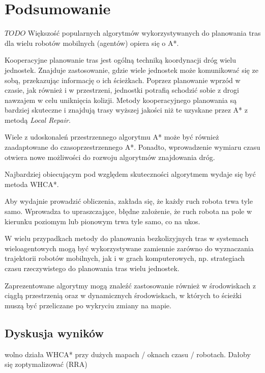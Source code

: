 \chapter{Podsumowanie}
\label{ch:podsumowanie}

$TODO$
Większość popularnych algorytmów wykorzystywanych do planowania tras dla wielu robotów mobilnych (agentów) opiera się o A*.

Kooperacyjne planowanie tras jest ogólną techniką koordynacji dróg wielu jednostek.
Znajduje zastosowanie, gdzie wiele jednostek może komunikować się ze sobą, przekazując informację o ich ścieżkach.
Poprzez planowanie wprzód w czasie, jak również i w przestrzeni, jednostki potrafią schodzić sobie z drogi nawzajem w celu uniknięcia kolizji.
Metody kooperacyjnego planowania są bardziej skuteczne i znajdują trasy wyższej jakości niż te uzyskane przez A* z metodą {\it Local Repair}.

Wiele z udoskonaleń przestrzennego algorytmu A* może być również zaadaptowane do czasoprzestrzennego A*.
Ponadto, wprowadzenie wymiaru czasu otwiera nowe możliwości do rozwoju algorytmów znajdowania dróg.

Najbardziej obiecującym pod względem skuteczności algorytmem wydaje się być metoda WHCA*.

Aby wydajnie prowadzić obliczenia, zakłada się, że każdy ruch robota trwa tyle samo. 
Wprowadza to upraszczające, błędne założenie, że ruch robota na pole w kierunku poziomym lub pionowym trwa tyle samo, co na ukos.

W wielu przypadkach metody do planowania bezkolizyjnych tras w systemach wieloagentowych mogą być wykorzystywane zamiennie zarówno do wyznaczania trajektorii robotów mobilnych, jak i w grach komputerowych, np. strategiach czasu rzeczywistego do planowania tras wielu jednostek.

Zaprezentowane algorytmy mogą znaleźć zastosowanie również w środowiskach z ciągłą przestrzenią oraz w dynamicznych środowiskach, w których to ścieżki muszą być przeliczane po wykryciu zmiany na mapie.

\section{Dyskusja wyników}

wolno działa WHCA* przy dużych mapach / oknach czasu / robotach. Dałoby się zoptymalizować (RRA)
